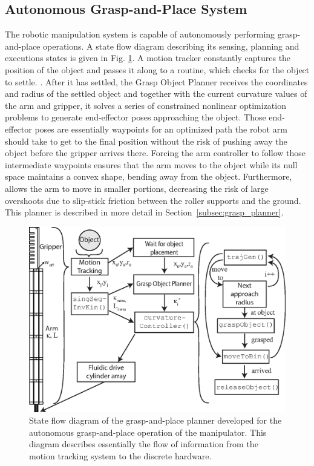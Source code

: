 \subsection{Autonomous Grasp-and-Place System}
\label{subsec:grasp-place-planner}
The robotic manipulation system is capable of autonomously performing grasp-and-place operations. 
A state flow diagram describing its sensing, planning and executions states is given in Fig. \ref{fig:grasp-and-place-planner}. 
A motion tracker constantly captures the position of the object and passes it along to a routine, which checks for the object to settle.
.
After it has settled, the Grasp Object Planner receives the coordinates and radius of the settled object and together with the current curvature values of the arm and gripper, it solves a series of constrained nonlinear optimization problems to generate end-effector poses approaching the object.
Those end-effector poses are essentially waypoints for an optimized path the robot arm should take to get to the final position without the risk of pushing away the object before the gripper arrives there. 
Forcing the arm controller to follow those intermediate waypoints ensures that the arm moves to the object while its null space maintains a convex shape,  bending away from the object. 
Furthermore,  allows the arm to move in smaller portions, decreasing the risk of large overshoots due to slip-stick friction between the roller supports and the ground.
This planner is described in more detail in Section~\ref{subsec:grasp_planner}.

\begin{figure}[!htb]
\centering
   \includegraphics[width=0.95\columnwidth]{Figures/processing_control/grasp_place_planner.eps}
   \caption{State flow diagram of the grasp-and-place planner developed for the autonomous grasp-and-place operation of the manipulator. This diagram describes essentially the flow of information from the motion tracking system to the discrete hardware.}
   \label{fig:grasp-and-place-planner}
\end{figure}


